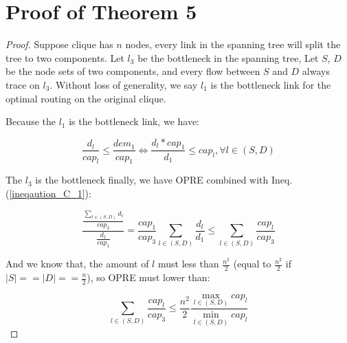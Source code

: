 \documentclass[conference]{IEEEtran}
\begin{document}
\section{Proof of Theorem 5}
\begin{proof}
Suppose clique has $n$ nodes, every link in the spanning tree will split the tree to two components. 
Let $l_3$ be the bottleneck in the spanning tree, Let $S$, $D$ be the node sets of two components, and every flow 
between $S$ and $D$ always trace on $l_3$. Without loss of generality, we say $l_1$ is the bottleneck link for the 
optimal routing on the original clique.

Because the $l_1$ is the bottleneck link, we have:

\begin{equation}
\label{ineqaution_C_1}
    \frac{d_l}{cap_l} \leq \frac{dem_1}{cap_1} \Longleftrightarrow \frac{d_l * cap_1}{d_1} \leq cap_l,  \forall l \in (S,D)
\end{equation}


The $l_3$ is the bottleneck finally, we have OPRE combined with Ineq. (\ref{ineqaution_C_1}):

\begin{equation}
\label{ineqaution_C_2}
    \frac{\frac{\sum_{l \in (S,D)} d_l}{cap_3}}{\frac{d_1}{cap_1}} = \frac{cap_1}{cap_3} \sum_{l \in (S,D)} \frac{d_l}{d_1}
     \leq \sum_{l \in (S,D)} \frac{cap_l}{cap_3}
\end{equation}

And we know that, the amount of $l$ must less than $\frac{n^2}{2}$ (equal to $\frac{n^2}{2}$ if $|S| == |D| == \frac{n}{2}$), 
so OPRE must lower than:

\begin{equation}
\label{ineqaution_C_result}
    \sum_{l \in (S,D)} \frac{cap_l}{cap_3} \leq \frac{n^2}{2} \frac{\max_{l \in (S,D)} cap_l}{\min_{l \in (S,D)} cap_l}
\end{equation}

\end{proof}

\end{document}
